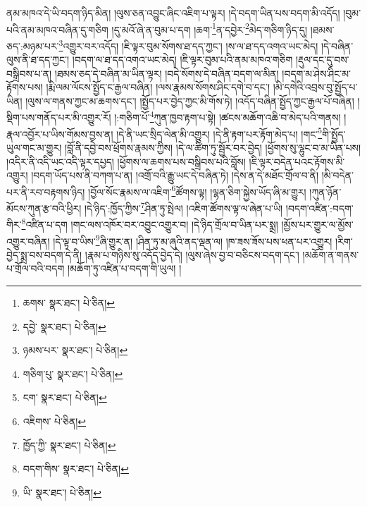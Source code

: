 ནམ་མཁའ་དེ་ཡི་བདག་ཉིད་མིན། །ལུས་ཅན་འབྱུང་ཞིང་འཇིག་པ་ལྟར། །དེ་བདག་ཡིན་པས་བདག་མི་འདོད། །བུམ་པའི་ནམ་མཁའ་བཞིན་དུ་གཅིག །དུ་མའོ་ཞེ་ན་བུམ་པ་དག །ཆག་\footnote{ཆགས་  སྣར་ཐང་།  པེ་ཅིན། }ན་དབྱེར་\footnote{དབྱེ་  སྣར་ཐང་།  པེ་ཅིན། }མེད་གཅིག་ཉིད་དུ། །ཐམས་ཅད་:མཉམ་པར་\footnote{ཉམས་པར་  སྣར་ཐང་།  པེ་ཅིན། }འགྱུར་བར་འདོད། །ཇི་ལྟར་བུམ་སོགས་ཐ་དད་ཀྱང་། །ས་ལ་ཐ་དད་འགའ་ཡང་མེད། །དེ་བཞིན་ལུས་ནི་ཐ་དད་ཀྱང་། །བདག་ལ་ཐ་དད་འགའ་ཡང་མེད། །ཇི་ལྟར་བུམ་པའི་ནམ་མཁའ་གཅིག །རྡུལ་དང་དུ་བས་བསྒྲིབས་པ་ན། །ཐམས་ཅད་དེ་བཞིན་མ་ཡིན་ལྟར། །བདེ་སོགས་དེ་བཞིན་བདག་ལ་མིན། །བདག་མ་ཤེས་ཤིང་མ་རྟོགས་པས། །རྨི་ལམ་ལོངས་སྤྱོད་ང་རྒྱལ་བཞིན། །ལས་རྣམས་སོགས་ཤིང་དགེ་བ་དང་། །མི་དགེའི་འབྲས་བུ་སྤྱོད་པ་ཡིན། །ལུས་ལ་གནས་ཀྱང་མ་ཆགས་དང་། །སྤྱོད་པར་བྱེད་ཀྱང་མི་གོས་ཏེ། །འདོད་བཞིན་སྤྱོད་ཀྱང་རྒྱལ་པོ་བཞིན། །སྡིག་པས་གནོད་པར་མི་འགྱུར་རོ། །:གཅིག་པོ་\footnote{གཅིག་པུ་  སྣར་ཐང་།  པེ་ཅིན། }ཀུན་ཁྱབ་རྟག་པ་སྟེ། །ཚངས་མཆོག་འཆི་བ་མེད་པའི་གནས། །རྣལ་འབྱོར་པ་ཡིས་གོམས་བྱས་ན། །དེ་ནི་ཡང་སྲིད་ལེན་མི་འགྱུར། །དེ་ནི་རྟག་པར་རྟོག་མེད་པ། །གང་\footnote{ངག་  སྣར་ཐང་།  པེ་ཅིན། }གི་སྤྱོད་ཡུལ་གང་མ་གྱུར། །བློ་ནི་དབྱེ་བས་ཕྲོགས་རྣམས་ཀྱིས། །དེ་ལ་ཚིག་ཏུ་སྦྱོར་བར་བྱེད། །ཕྱོགས་སུ་ལྷུང་བ་མ་ཡིན་པས། །འདིར་ནི་འདི་ཡང་འདི་ལྟར་དཔྱད། །ཕྱོགས་ལ་ཆགས་པས་བསྒྲིབས་པའི་བློས། །ཇི་ལྟར་བདེན་པའང་རྟོགས་མི་འགྱུར། །བདག་ཡོད་པས་ནི་བཀག་པ་ན། །འགྲོ་བའི་རྒྱུ་ཡང་དེ་བཞིན་ཏེ། །དེས་ན་དེ་མཐོང་གྲོལ་བ་ནི། །མི་བདེན་པར་ནི་རབ་བརྟགས་ཉིད། །བྱོལ་སོང་རྣམས་ལ་འཇིག་\footnote{འཇིགས་  པེ་ཅིན། }ཚོགས་ལྟ། །ལྷན་ཅིག་སྐྱེས་ཡོད་ཞི་མ་གྱུར། །ཀུན་ཉོན་མོངས་ཀུན་རྩ་བའི་ཕྱིར། །དེ་ཉིད་:ཁྱོད་ཀྱིས་\footnote{ཁྱོད་ཀྱི་  སྣར་ཐང་།  པེ་ཅིན། }ཤིན་ཏུ་སྤེལ། །འཇིག་ཚོགས་ལྟ་ལ་ཞེན་པ་ཡི། །བདག་འཛིན་:བདག་གིར་\footnote{བདག་གིས་  སྣར་ཐང་།  པེ་ཅིན། }འཛིན་པ་དག །གང་ལས་འཁོར་བར་འབྱུང་འགྱུར་བ། །དེ་ཉིད་གྲོལ་བ་ཡིན་པར་སྨྲ། །མྱོས་པར་གྱུར་ལ་མྱོས་འགྱུར་བཞིན། །དེ་ལྟ་བ་ཡིས་\footnote{ཡི་  སྣར་ཐང་།  པེ་ཅིན། }ཞི་གྱུར་ན། །ཤིན་ཏུ་མ་ཞུའི་ནད་ལྡན་ལ། །ཁ་ཟས་ཟོས་པས་ཕན་པར་འགྱུར། །རིག་བྱེད་སྨྲ་བས་བདག་དེ་ནི། །རྣམ་པ་གཉིས་སུ་འདོད་བྱེད་དེ། །ལུས་ཞེས་བྱ་བ་བཅིངས་བདག་དང་། །མཆོག་ན་གནས་པ་གྲོལ་བའི་བདག །མཆོག་ཏུ་འཛིན་པ་བདག་གི་ཡུལ། །
